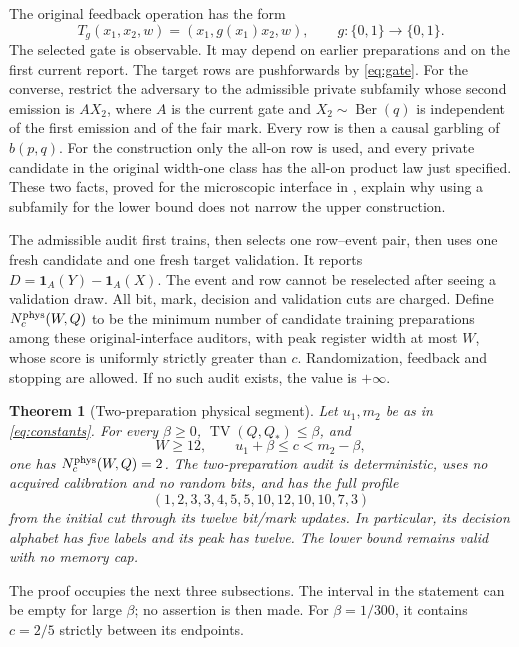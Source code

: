 \documentclass[11pt]{amsart}
\newtheorem{theorem}{Theorem}[section]
\theoremstyle{definition}\newtheorem{definition}[theorem]{Definition}
\theoremstyle{remark}\newtheorem{remark}[theorem]{Remark}
\newcommand{\TV}{\operatorname{TV}}
\newcommand{\Ber}{\operatorname{Ber}}
\newcommand{\1}{\mathbf 1}
\newcommand{\Qstar}{Q_*}
\begin{document}
The original feedback operation has the form
\begin{equation}\label{eq:gate}
 T_g(x_1,x_2,w)=(x_1,g(x_1)x_2,w),
 \qquad g:\{0,1\}\longrightarrow\{0,1\}.
\end{equation}
The selected gate is observable. It may depend on earlier preparations
and on the first current report. The target rows are pushforwards by
\eqref{eq:gate}. For the converse, restrict the adversary to the admissible
private subfamily whose second emission is $A X_2$, where $A$ is the
current gate and $X_2\sim\Ber(q)$ is independent of the first emission
and of the fair mark. Every row is then a causal garbling of $b(p,q)$.
For the construction only the all-on row is used, and every private
candidate in the original width-one class has the all-on product law
just specified. These two facts, proved for the microscopic interface in
\cite[physical-complexity, feedback-completion lemma]{Companion}, explain
why using a subfamily for the lower bound does not narrow the upper
construction.

The admissible audit first trains, then selects one row--event pair, then
uses one fresh candidate and one fresh target validation. It reports
$D=\1_A(Y)-\1_A(X)$. The event and row cannot be reselected after
seeing a validation draw. All bit, mark, decision and validation cuts are
charged. Define $N_c^{\rm phys}(W,Q)$ to be the minimum number of candidate
training preparations among these original-interface auditors, with peak
register width at most $W$, whose score is uniformly strictly greater
than $c$. Randomization, feedback and stopping are allowed. If no such
audit exists, the value is $+\infty$.

\begin{theorem}[Two-preparation physical segment]\label{thm:physical}
Let $u_1,m_2$ be as in \eqref{eq:constants}. For every $\beta\ge0$,
$\TV(Q,\Qstar)\le\beta$, and
\[
       W\ge12,\qquad u_1+\beta\le c<m_2-\beta,
\]
one has $N_c^{\rm phys}(W,Q)=2$. The two-preparation audit is deterministic,
uses no acquired calibration and no random bits, and has the full profile
\begin{equation}\label{eq:profile}
 (1,2,3,3,4,5,5,10,12,10,10,7,3)
\end{equation}
from the initial cut through its twelve bit/mark updates. In particular,
its decision alphabet has five labels and its peak has twelve. The lower
bound remains valid with no memory cap.
\end{theorem}
The proof occupies the next three subsections. The interval in the
statement can be empty for large $\beta$; no assertion is then made.
For $\beta=1/300$, it contains $c=2/5$ strictly between its endpoints.
\end{document}

